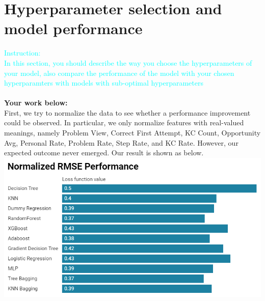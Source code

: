 \documentclass{article}
\begin{document}
\section{Hyperparameter selection and model performance}
\textcolor{cyan}{Instruction: \\
In this section, you should describe the way you choose the hyperparameters of your model, also compare the performance of the model with your chosen hyperparamters with models with sub-optimal hyperparameters}\\\\
\textbf{Your work below:}\\
First, we try to normalize the data to see whether a performance improvement could be observed.
In particular, we only normalize features with real-valued meanings, namely Problem View, Correct First Attempt, KC Count, Opportunity Avg, 
Personal Rate, Problem Rate, Step Rate, and KC Rate. However, our expected outcome never emerged. Our result is shown as below.\\
\includegraphics[width=1\linewidth]{normalized.png}
\end{document}
